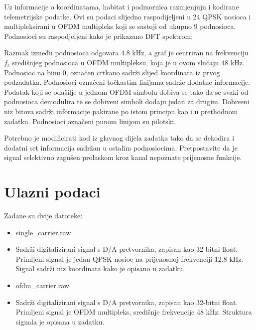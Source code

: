 \documentclass[a4paper]{article}
\begin{document}
Uz informacije o koordinatama, habitat i podmornica razmjenjuju i kodirane telemetrijske podatke. Ovi su podaci slijedno raspodijeljeni u 24 QPSK nosioca i multipleksirani u OFDM  multipleks koji se sastoji od ukupno 9 podnosioca. Podnosioci su raspodjeljeni kako je prikazano DFT spektrom:
\begin{figure}[h!]
	\centering
\end{figure}
Razmak između podnosioca odgovara 4.8 kHz, a graf je centriran na frekvenciju $f_c$ središnjeg podnosioca u OFDM multipleksu, koja je u ovom slučaju 48 kHz. Podnosioc na binu 0, označen crtkano sadrži slijed koordinata iz prvog podzadatka. Podnosioci označeni točkastim linijama sadrže dodatne informacije. Podatak koji se odašilje u jednom OFDM simbolu dobiva se tako da se svaki od podnosioca demodulira te se dobiveni simboli dodaju jedan za drugim. Dobiveni niz bitova sadrži informacije pakirane po istom principu kao i u prethodnom zadatku. Podnosioci označeni punom linijom su pilotski.

Potrebno je modificirati kod iz glavnog dijela zadatka tako da se dekodira i dodatni set informacija sadržan u ostalim podnosiocima. Pretpostavite da je signal selektivno zagušen prolaskom kroz kanal nepoznate prijenosne funkcije.

\section{Ulazni podaci}
Zadane su dvije datoteke:
\begin{itemize}
\item single\_carrier.raw
\item[] Sadrži digitalizirani signal s D/A pretvornika, zapisan kao 32-bitni float. Primljeni signal je jedan QPSK nosioc na prijenosnoj frekvenciji 12.8 kHz. Signal sadrži niz koordinata kako je opisano u zadatku.
\item ofdm\_carrier.raw
\item[] Sadrži digitalizirani signal s D/A pretvornika, zapisan kao 32-bitni float. Primljeni signal je OFDM multipleks, središnje frekvencije 48 kHz. Struktura signala je opisana u zadatku.
\end{itemize}
\end{document}
